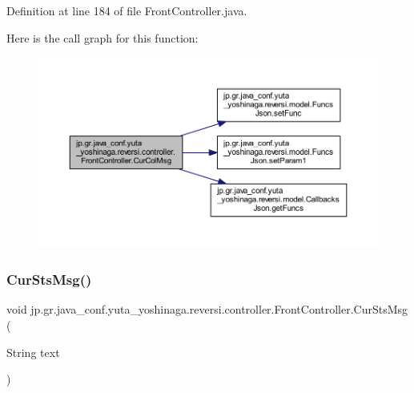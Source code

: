 Definition at line 184 of file Front\+Controller.\+java.

Here is the call graph for this function\+:\nopagebreak
\begin{figure}[H]
\begin{center}
\leavevmode
\includegraphics[width=350pt]{classjp_1_1gr_1_1java__conf_1_1yuta__yoshinaga_1_1reversi_1_1controller_1_1_front_controller_ac49c44c8bb767770364c52164b699110_cgraph}
\end{center}
\end{figure}
\mbox{\label{classjp_1_1gr_1_1java__conf_1_1yuta__yoshinaga_1_1reversi_1_1controller_1_1_front_controller_a49315230e704778721afb73c59e14d88}} 
\subsubsection{\texorpdfstring{Cur\+Sts\+Msg()}{CurStsMsg()}}
{\footnotesize\ttfamily void jp.\+gr.\+java\+\_\+conf.\+yuta\+\_\+yoshinaga.\+reversi.\+controller.\+Front\+Controller.\+Cur\+Sts\+Msg (\begin{DoxyParamCaption}\item[{String}]{text }\end{DoxyParamCaption})}



